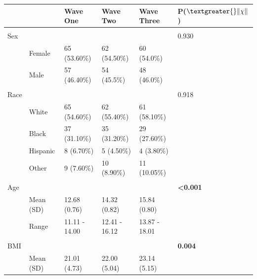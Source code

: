 \documentclass[utf8]{frontiersSCNS} %
\begin{document}
\begin{table}[h!]
\begin{tabular}{llllll}
                    &                 & Wave One         & Wave Two         & Wave Three       & P($\textgreater{}\|\chi\|$)       \\ \hline \\
Sex                 &                 &                  &                  &                  & 0.930                    \\
                    & Female          & 65 (53.60\%)     & 62 (54.50\%)     & 60 (54.0\%)      &                          \\
                    & Male            & 57 (46.40\%)     & 54 (45.5\%)      & 48 (46.0\%)      &                          \\ \hline \\
Race                &                 &                  &                  &                  & 0.918                    \\
                    & White           & 65 (54.60\%)      & 62 (55.40\%)      & 61 (58.10\%)      &                          \\
                    & Black           & 37 (31.10\%)      & 35 (31.20\%)      & 29 (27.60\%)      &                          \\
                    & Hispanic        & 8 (6.70\%)        & 5 (4.50\%)        & 4 (3.80\%)        &                          \\
                    & Other           & 9 (7.60\%)       & 10 (8.90\%)       & 11 (10.05\%)      &                          \\ \hline \\
Age        &                 &                  &                  &                  & \textbf{\textless 0.001} \\
                    & Mean (SD)       & 12.68 (0.76)   & 14.32 (0.82)   & 15.84 (0.80)   &                          \\
                    & Range           & 11.11 - 14.00    & 12.41 - 16.12     & 13.87 - 18.01    &                          \\       \hline \\              
BMI        &                 &                  &                  &                  & \textbf{0.004}           \\
                    & Mean (SD)       & 21.01 (4.73)   & 22.00 (5.04)   & 23.14 (5.15)   &                          \\

\end{tabular}
\end{table}
\end{document}
